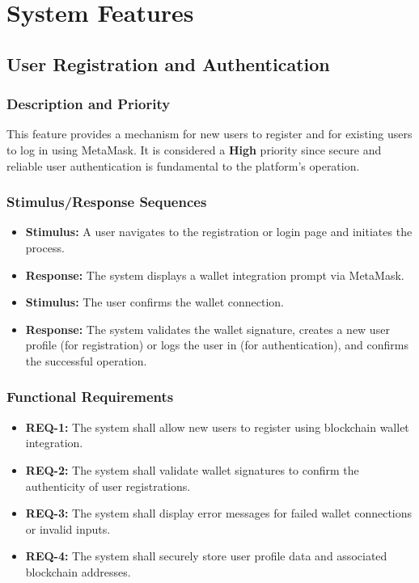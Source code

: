 \documentclass[a4paper,12pt]{article}
\begin{document}
\section{System Features}

\subsection{User Registration and Authentication}
\subsubsection{Description and Priority}
This feature provides a mechanism for new users to register and for existing users to log in using MetaMask. It is considered a \textbf{High} priority since secure and reliable user authentication is fundamental to the platform's operation.

\subsubsection{Stimulus/Response Sequences}
\begin{itemize}
    \item \textbf{Stimulus:} A user navigates to the registration or login page and initiates the process.
    \item \textbf{Response:} The system displays a wallet integration prompt via MetaMask.
    \item \textbf{Stimulus:} The user confirms the wallet connection.
    \item \textbf{Response:} The system validates the wallet signature, creates a new user profile (for registration) or logs the user in (for authentication), and confirms the successful operation.
\end{itemize}

\subsubsection{Functional Requirements}
\begin{itemize}
    \item \textbf{REQ-1:} The system shall allow new users to register using blockchain wallet integration.
    \item \textbf{REQ-2:} The system shall validate wallet signatures to confirm the authenticity of user registrations.
    \item \textbf{REQ-3:} The system shall display error messages for failed wallet connections or invalid inputs.
    \item \textbf{REQ-4:} The system shall securely store user profile data and associated blockchain addresses.
\end{itemize}
\end{document}
